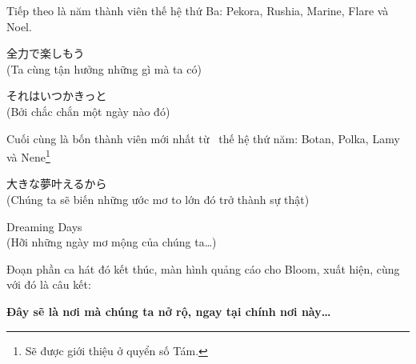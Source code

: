 \documentclass[../main.tex]{subfiles}
\begin{document}
Tiếp theo là năm thành viên thế hệ thứ Ba: Pekora, Rushia, Marine, Flare và Noel.

\begin{center}
  全力で楽しもう \\
  (Ta cùng tận hưởng những gì mà ta có)

  それはいつかきっと \\
  (Bởi chắc chắn một ngày nào đó)
\end{center}

Cuối cùng là bốn thành viên mới nhất từ \hll\ thế hệ thứ năm: Botan, Polka, Lamy và Nene\footnote{Sẽ được giới thiệu ở quyển số Tám.}

\begin{center}
  大きな夢叶えるから \\
  (Chúng ta sẽ biến những ước mơ to lớn đó trở thành sự thật)

  {\fotskip Dreaming Days} \\
  (Hỡi những ngày mơ mộng của chúng ta\dots)
\end{center}

Đoạn phần ca hát đó kết thúc, màn hình quảng cáo cho Bloom, xuất hiện, cùng với đó là câu kết:

\begin{center}
  \textbf{Đây sẽ là nơi mà chúng ta nở rộ, ngay tại chính nơi này\dots}
\end{center}
\end{document}
